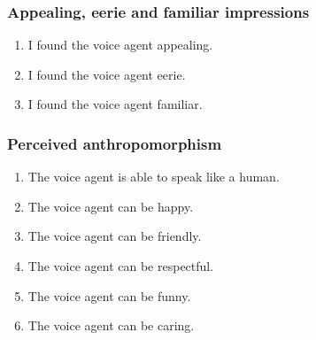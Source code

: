 \documentclass[11pt,letterpaper]{article}
\begin{document}
\subsubsection*{Appealing, eerie and familiar impressions}
\begin{enumerate}
\item[Q20.] I found the voice agent appealing.
\item[Q21.] I found the voice agent eerie.
\item[Q22.] I found the voice agent familiar.
\end{enumerate}
\subsubsection*{Perceived anthropomorphism}
\begin{enumerate}
\item[Q37.] The voice agent is able to speak like a human.
\item[Q38.] The voice agent can be happy.
\item[Q39.] The voice agent can be friendly.
\item[Q40.] The voice agent can be respectful.
\item[Q41.] The voice agent can be funny.
\item[Q42.] The voice agent can be caring.
\end{enumerate}
\end{document}
